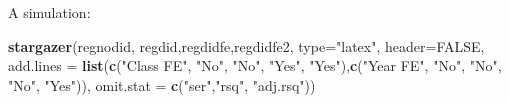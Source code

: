 \documentclass[
  ignorenonframetext,
]{beamer}
\newenvironment{Shaded}{\begin{snugshade}}{\end{snugshade}}
\newcommand{\AttributeTok}[1]{\textcolor[rgb]{0.13,0.29,0.53}{#1}}
\newcommand{\ConstantTok}[1]{\textcolor[rgb]{0.56,0.35,0.01}{#1}}
\newcommand{\FunctionTok}[1]{\textcolor[rgb]{0.13,0.29,0.53}{\textbf{#1}}}
\newcommand{\NormalTok}[1]{#1}
\newcommand{\StringTok}[1]{\textcolor[rgb]{0.31,0.60,0.02}{#1}}
\begin{document}
\begin{frame}[fragile]{A simulation:}
\protect\hypertarget{a-simulation-4}{}
\tiny

\begin{Shaded}
\begin{Highlighting}[]
\FunctionTok{stargazer}\NormalTok{(regnodid, regdid,regdidfe,regdidfe2, }\AttributeTok{type=}\StringTok{"latex"}\NormalTok{, }\AttributeTok{header=}\ConstantTok{FALSE}\NormalTok{, }
          \AttributeTok{add.lines =} \FunctionTok{list}\NormalTok{(}\FunctionTok{c}\NormalTok{(}\StringTok{"Class FE"}\NormalTok{, }\StringTok{"No"}\NormalTok{, }\StringTok{"No"}\NormalTok{, }\StringTok{"Yes"}\NormalTok{, }\StringTok{"Yes"}\NormalTok{),}\FunctionTok{c}\NormalTok{(}\StringTok{"Year FE"}\NormalTok{, }\StringTok{"No"}\NormalTok{, }\StringTok{"No"}\NormalTok{, }\StringTok{"No"}\NormalTok{, }\StringTok{"Yes"}\NormalTok{)), }\AttributeTok{omit.stat =} \FunctionTok{c}\NormalTok{(}\StringTok{"ser"}\NormalTok{,}\StringTok{"rsq"}\NormalTok{, }\StringTok{"adj.rsq"}\NormalTok{))}
\end{Highlighting}
\end{Shaded}


\end{frame}
\end{document}

